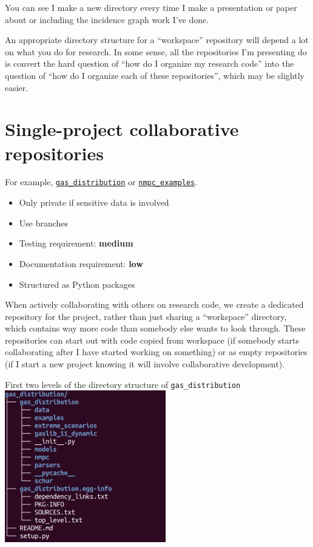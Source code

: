 \documentclass{article}
\begin{document}
You can see I make a new directory every time I make a presentation or
paper about or including the incidence graph work I've done.

An appropriate directory structure for a ``workspace'' repository will depend a
lot on what you do for research. In some sense, all the repositories I'm
presenting do is convert the hard question of ``how do I organize my research
code'' into the question of ``how do I organize each of these repositories'',
which may be slightly easier.

\section{Single-project collaborative repositories}
For example,
\href{https://github.com/Robbybp/gas_distribution}{\texttt{gas\_distribution}}
or
\href{https://github.com/robbybp/nmpc_examples}{\texttt{nmpc\_examples}}.
\begin{itemize}
  \item Only private if sensitive data is involved
  \item Use branches
  \item Testing requirement: {\color{purple}\bf medium}
  \item Documentation requirement: {\color{blue}\bf low}
  \item Structured as Python packages
\end{itemize}
When actively collaborating with others on research code, we create
a dedicated repository for the project, rather than just sharing a
``workspace'' directory, which contains way more code than somebody else
wants to look through.
These repositories can start out with code copied from workspace
(if somebody starts collaborating after I have started working on something)
or as empty repositories (if I start a new project knowing it will
involve collaborative development).

\begin{center}
  First two levels of the directory structure of \texttt{gas\_distribution}
  \includegraphics[width=7cm]{gas_distribution_tree.png}
\end{center}
\end{document}
